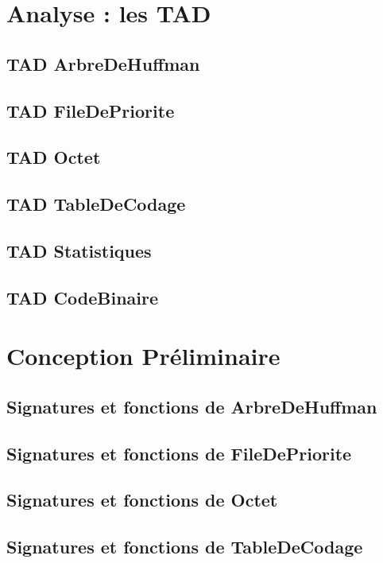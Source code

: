\documentclass[10pt]{article}
\begin{document}
    \section{Analyse : les TAD}
        \subsection{TAD ArbreDeHuffman}
        
        \subsection{TAD FileDePriorite}
        
        \subsection{TAD Octet}
        
        \subsection{TAD TableDeCodage}
        
        \subsection{TAD Statistiques}
        
        \subsection{TAD CodeBinaire}
        
    \section{Conception Préliminaire}
        \subsection{Signatures et fonctions de ArbreDeHuffman}
        
        \subsection{Signatures et fonctions de FileDePriorite}
        
        \subsection{Signatures et fonctions de Octet}
        
        \subsection{Signatures et fonctions de TableDeCodage}
        
\end{document}
